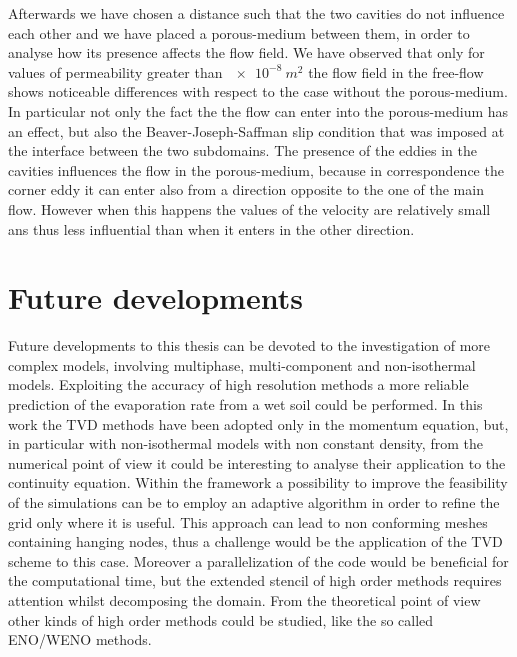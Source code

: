 Afterwards we have chosen a distance such that the two cavities do not 
influence each other and we have placed a porous-medium between them, in order 
to analyse how its presence affects the flow field. We have observed that only 
for values of permeability greater than $\SI{e-8}{m^2}$ the flow field in the 
free-flow shows noticeable differences with respect to the case without the 
porous-medium. In particular not only the fact the the flow can enter into the 
porous-medium has an effect, but also the Beaver-Joseph-Saffman slip condition 
that was imposed at the interface between the two subdomains. The presence of 
the eddies in the cavities influences the flow in the porous-medium, because 
in correspondence the corner eddy it can enter also from a direction opposite 
to the one of the main flow. However when this happens the values of the 
velocity are relatively small ans thus less influential than when it enters in 
the other direction.
%
\section{Future developments}
Future developments to this thesis can be devoted to the investigation of more 
complex models, involving multiphase, multi-component and non-isothermal 
models. Exploiting the accuracy of high resolution methods a more reliable 
prediction of the evaporation rate from a wet soil could be performed.
In this work the TVD methods have been adopted only in the momentum equation, 
but, in particular with non-isothermal models with non constant density, from 
the numerical point of view it could be interesting to analyse their 
application to the continuity equation.
Within the \DUMUX framework a possibility to improve the feasibility of the 
simulations can be to employ an adaptive algorithm in order to refine the grid 
only where it is useful. This approach can lead to non conforming meshes 
containing hanging nodes, thus a challenge would be the application of the TVD 
scheme to this case. Moreover a parallelization of the code would be 
beneficial 
for the computational time, but the extended stencil of high order methods 
requires attention whilst decomposing the domain.
From the theoretical point of view other kinds of high order methods could be 
studied, like the so called ENO/WENO methods.%

